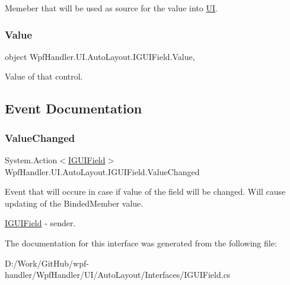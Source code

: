 Memeber that will be used as source for the value into \mbox{\hyperlink{namespace_wpf_handler_1_1_u_i}{UI}}. 

\mbox{\label{interface_wpf_handler_1_1_u_i_1_1_auto_layout_1_1_i_g_u_i_field_a6603f5bb3eeee52e2d061d6d0f40720a}} 
\subsubsection{\texorpdfstring{Value}{Value}}
{\footnotesize\ttfamily object Wpf\+Handler.\+U\+I.\+Auto\+Layout.\+I\+G\+U\+I\+Field.\+Value\hspace{0.3cm}{\ttfamily [get]}, {\ttfamily [set]}}



Value of that control. 



\subsection{Event Documentation}
\mbox{\label{interface_wpf_handler_1_1_u_i_1_1_auto_layout_1_1_i_g_u_i_field_a97d9c046f0ed12e42560f2c7fb414d5f}} 
\subsubsection{\texorpdfstring{Value\+Changed}{ValueChanged}}
{\footnotesize\ttfamily System.\+Action$<$\mbox{\hyperlink{interface_wpf_handler_1_1_u_i_1_1_auto_layout_1_1_i_g_u_i_field}{I\+G\+U\+I\+Field}}$>$ Wpf\+Handler.\+U\+I.\+Auto\+Layout.\+I\+G\+U\+I\+Field.\+Value\+Changed}



Event that will occure in case if value of the field will be changed. Will cause updating of the Binded\+Member value. 

\mbox{\hyperlink{interface_wpf_handler_1_1_u_i_1_1_auto_layout_1_1_i_g_u_i_field}{I\+G\+U\+I\+Field}} -\/ sender. 

The documentation for this interface was generated from the following file\+:\begin{DoxyCompactItemize}
\item 
D\+:/\+Work/\+Git\+Hub/wpf-\/handler/\+Wpf\+Handler/\+U\+I/\+Auto\+Layout/\+Interfaces/I\+G\+U\+I\+Field.\+cs\end{DoxyCompactItemize}
